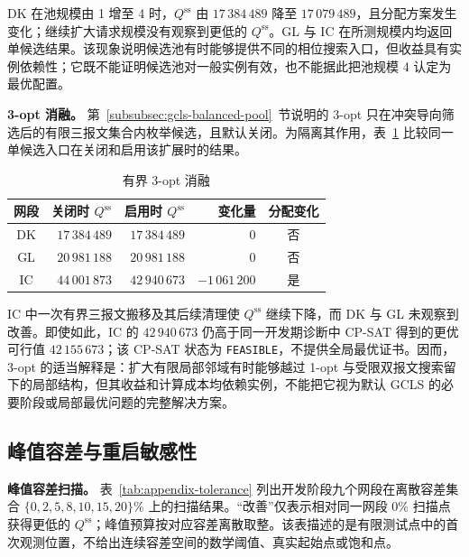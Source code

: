 \documentclass[UTF8,a4paper,twoside,zihao=-4]{ctexart}
\numberwithin{equation}{section}
\numberwithin{figure}{section}
\numberwithin{table}{section}
\theoremstyle{definition}
\numberwithin{algocf}{section}
\begin{document}
DK 在池规模由 1 增至 4 时，$Q^{\mathrm{ss}}$ 由 $17\,384\,489$ 降至 $17\,079\,489$，且分配方案发生变化；继续扩大请求规模没有观察到更低的 $Q^{\mathrm{ss}}$。GL 与 IC 在所测规模内均返回单候选结果。该现象说明候选池有时能够提供不同的相位搜索入口，但收益具有实例依赖性；它既不能证明候选池对一般实例有效，也不能据此把池规模 4 认定为最优配置。

\noindent\textbf{3-opt 消融。}
第~\ref{subsubsec:gcls-balanced-pool}~节说明的 3-opt 只在冲突导向筛选后的有限三报文集合内枚举候选，且默认关闭。为隔离其作用，表~\ref{tab:appendix-three-opt} 比较同一单候选入口在关闭和启用该扩展时的结果。

\begin{table}[htbp]
\centering
\small
\caption{有界 3-opt 消融}
\label{tab:appendix-three-opt}
\begin{tabular}{@{}crrrc@{}}
\toprule
网段 & 关闭时 $Q^{\mathrm{ss}}$ & 启用时 $Q^{\mathrm{ss}}$ & 变化量 & 分配变化 \\
\midrule
DK & $17\,384\,489$ & $17\,384\,489$ & $0$ & 否 \\
GL & $20\,981\,188$ & $20\,981\,188$ & $0$ & 否 \\
IC & $44\,001\,873$ & $42\,940\,673$ & $-1\,061\,200$ & 是 \\
\bottomrule
\end{tabular}
\end{table}

IC 中一次有界三报文搬移及其后续清理使 $Q^{\mathrm{ss}}$ 继续下降，而 DK 与 GL 未观察到改善。即使如此，IC 的 $42\,940\,673$ 仍高于同一开发期诊断中 CP-SAT 得到的更优可行值 $42\,155\,673$；该 CP-SAT 状态为 \texttt{FEASIBLE}，不提供全局最优证书。因而，3-opt 的适当解释是：扩大有限局部邻域有时能够越过 1-opt 与受限双报文搜索留下的局部结构，但其收益和计算成本均依赖实例，不能把它视为默认 GCLS 的必要阶段或局部最优问题的完整解决方案。

\subsection{峰值容差与重启敏感性}
\label{subsec:appendix-tolerance-restart}

\noindent\textbf{峰值容差扫描。}
表~\ref{tab:appendix-tolerance} 列出开发阶段九个网段在离散容差集合
$\{0,2,5,8,10,15,20\}\%$ 上的扫描结果。“改善”仅表示相对同一网段 $0\%$ 扫描点获得更低的 $Q^{\mathrm{ss}}$；峰值预算按对应容差离散取整。该表描述的是有限测试点中的首次观测位置，不给出连续容差空间的数学阈值、真实起始点或饱和点。
\end{document}
